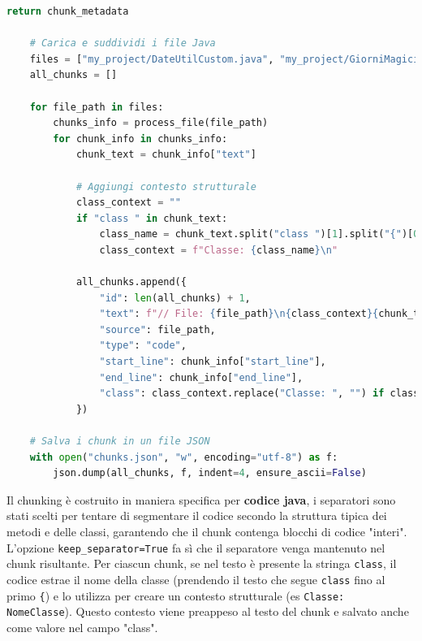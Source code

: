 \documentclass[12pt,a4paper,openright,twoside]{book}
\begin{document}
\begin{lstlisting}[language=Python, caption={Codice Python per la suddivisione dei file Java in chunk}, label={lst:chunking}]
        return chunk_metadata
    
    # Carica e suddividi i file Java
    files = ["my_project/DateUtilCustom.java", "my_project/GiorniMagici.java", "my_project/BasketballStats.java"]
    all_chunks = []
    
    for file_path in files:
        chunks_info = process_file(file_path)
        for chunk_info in chunks_info:
            chunk_text = chunk_info["text"]
            
            # Aggiungi contesto strutturale
            class_context = ""
            if "class " in chunk_text:
                class_name = chunk_text.split("class ")[1].split("{")[0].strip()
                class_context = f"Classe: {class_name}\n"
            
            all_chunks.append({
                "id": len(all_chunks) + 1,
                "text": f"// File: {file_path}\n{class_context}{chunk_text}",
                "source": file_path,
                "type": "code",
                "start_line": chunk_info["start_line"],
                "end_line": chunk_info["end_line"],
                "class": class_context.replace("Classe: ", "") if class_context else ""
            })
    
    # Salva i chunk in un file JSON
    with open("chunks.json", "w", encoding="utf-8") as f:
        json.dump(all_chunks, f, indent=4, ensure_ascii=False)
\end{lstlisting}
Il chunking è costruito in maniera specifica per \textbf{codice java}, i separatori sono stati scelti per tentare di segmentare il codice secondo la struttura tipica dei metodi e delle classi, garantendo che il chunk contenga blocchi di codice "interi".
L'opzione \texttt{keep\_separator=True} fa sì che il separatore venga mantenuto nel chunk risultante.
Per ciascun chunk, se nel testo è presente la stringa \texttt{class}, il codice estrae il nome della classe 
(prendendo il testo che segue \texttt{class} fino al primo \texttt{\{}) e lo utilizza per creare un contesto 
strutturale (es \texttt{Classe: NomeClasse}).
Questo contesto viene preappeso al testo del chunk e salvato anche come valore nel campo "class".
\end{document}
